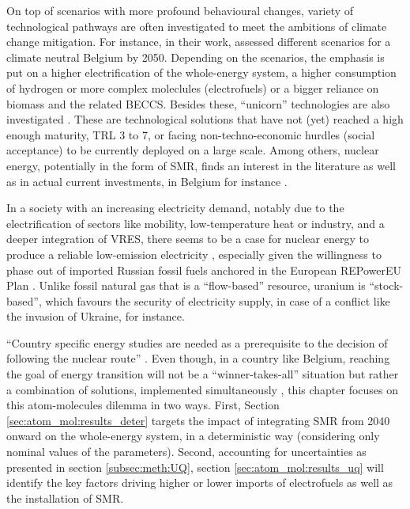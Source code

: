 On top of scenarios with more profound behavioural changes, variety of technological pathways are often investigated to meet the ambitions of climate change mitigation. For instance, in their work, \citet{My2050} assessed different scenarios for a climate neutral Belgium by 2050. Depending on the scenarios, the emphasis is put on a higher electrification of the whole-energy system, a higher consumption of hydrogen or more complex moleclules (\ie electrofuels) or a bigger reliance on biomass and the related \gls{BECCS}. Besides these, ``unicorn'' technologies are also investigated \cite{heuberger2018impact}. These are technological solutions that have not (yet) reached a high enough maturity, \ie TRL 3 to 7, or facing non-techno-economic hurdles (\ie social acceptance) to be currently deployed on a large scale. Among others, nuclear energy, potentially in the form of \acrfull{SMR}, finds an interest in the literature \cite{IEA_Nuclear_2022,PATHS2050} as well as in actual current investments, in Belgium for instance \cite{SMRlesoir}.

In a society with an increasing electricity demand, notably due to the electrification of sectors like mobility, low-temperature heat or industry, and a deeper integration of \gls{VRES}, there seems to be a case for nuclear energy to produce a reliable low-emission electricity \cite{IAEA2008}, especially given the willingness to phase out of imported Russian fossil fuels anchored in the European REPowerEU Plan \cite{REPowerEU}. Unlike fossil natural gas that is a ``flow-based'' resource, uranium is ``stock-based'', which favours the security of electricity supply, in case of a conflict like the invasion of Ukraine, for instance.

``Country specific energy studies are needed as a prerequisite to the decision of following the nuclear route'' \cite{IAEA2008}. Even though, in a country like Belgium, reaching the goal of energy transition will not be a ``winner-takes-all'' situation but rather a combination of solutions, implemented simultaneously \cite{Limpens2020}, this chapter focuses on this atom-molecules dilemma in two ways. First, Section \ref{sec:atom_mol:results_deter} targets the impact of integrating \gls{SMR} from 2040 onward on the whole-energy system, in a deterministic way (\ie considering only nominal values of the parameters). Second, accounting for uncertainties as presented in section \ref{subsec:meth:UQ}, section \ref{sec:atom_mol:results_uq} will identify the key factors driving higher or lower imports of electrofuels as well as the installation of \gls{SMR}. 


